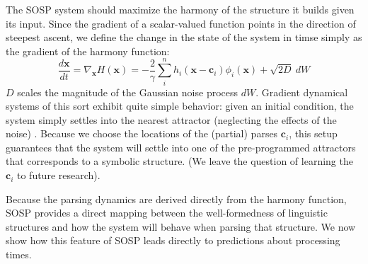 \documentclass[10pt,letterpaper]{article}
\begin{document}
The SOSP system should maximize the harmony of the structure it builds given its input. Since the gradient of a scalar-valued function points in the direction of steepest ascent, we define the change in the state of the system in timse simply as the gradient of the harmony function:
\begin{equation}\label{dyn}
\frac{d\mathbf{x}}{dt} = \nabla_\mathbf{x} H(\mathbf{x}) = -\frac{2}{\gamma} \sum_{i}^{n} h_i (\mathbf{x} - \mathbf{c}_i) \phi_i(\mathbf{x}) + \sqrt{2D}\ dW
\end{equation}
$D$ scales the magnitude of the Gaussian noise process $dW$. Gradient dynamical systems of this sort exhibit quite simple behavior: given an initial condition, the system simply settles into the nearest attractor (neglecting the effects of the noise) \cite{hirsch1974differential}. Because we choose the locations of the (partial) parses $\mathbf{c}_i$, this setup guarantees that the system will settle into one of the pre-programmed attractors that corresponds to a symbolic structure. (We leave the question of learning the $\mathbf{c}_i$ to future research).

Because the parsing dynamics are derived directly from the harmony function, SOSP provides a direct mapping between the well-formedness of linguistic structures and how the system will behave when parsing that structure. We now show how this feature of SOSP leads directly to predictions about processing times.
\end{document}
